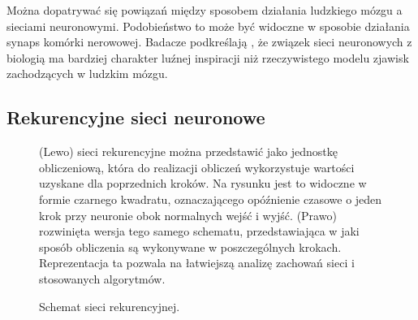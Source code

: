 \documentclass[oneside, mag]{mgr}
\begin{document}
Można dopatrywać się powiązań między sposobem działania ludzkiego mózgu a sieciami neuronowymi. Podobieństwo to może być widoczne w sposobie działania synaps komórki nerowowej. Badacze podkreślają \cite{Goodfellow-et-al-2016}, że związek sieci neuronowych z biologią ma bardziej charakter luźnej inspiracji niż rzeczywistego modelu zjawisk zachodzących w ludzkim mózgu.

\subsection{Rekurencyjne sieci neuronowe}

\begin{figure}
\centering
{}
\caption{Schemat sieci rekurencyjnej.} (Lewo) sieci rekurencyjne można przedstawić jako jednostkę obliczeniową, która do realizacji obliczeń wykorzystuje wartości uzyskane dla poprzednich kroków. Na rysunku jest to widoczne w formie czarnego kwadratu, oznaczającego opóźnienie czasowe o jeden krok przy neuronie obok normalnych wejść i wyjść. (Prawo) rozwinięta wersja tego samego schematu, przedstawiająca w jaki sposób obliczenia są wykonywane w poszczególnych krokach. Reprezentacja ta pozwala na łatwiejszą analizę zachowań sieci i stosowanych algorytmów. 
	\label{fig:rnn}
\end{figure}
\end{document}
